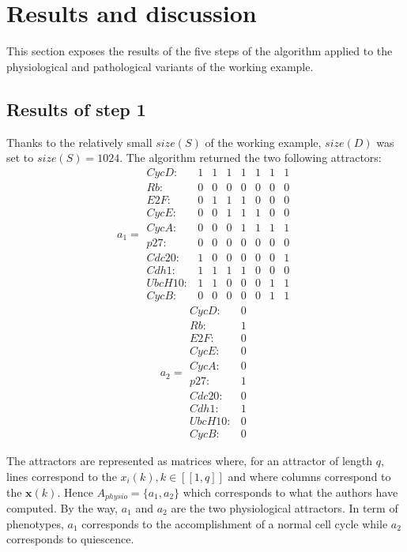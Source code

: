 \documentclass[oneside,a4paper,onecolumn,notitlepage,final]{article}
\begin{document}
\section{Results and discussion}
This section exposes the results of the five steps of the algorithm applied to the physiological and pathological variants of the working example.

\subsection{Results of step 1}
Thanks to the relatively small $size(S)$ of the working example, $size(D)$ was set to $size(S)=1024$. The algorithm returned the two following attractors:
\begin{equation*}
a_{1}=
\begin{matrix}
CycD:&1&1&1&1&1&1&1\\
Rb:&0&0&0&0&0&0&0\\
E2F:&0&1&1&1&0&0&0\\
CycE:&0&0&1&1&1&0&0\\
CycA:&0&0&0&1&1&1&1\\
p27:&0&0&0&0&0&0&0\\
Cdc20:&1&0&0&0&0&0&1\\
Cdh1:&1&1&1&1&0&0&0\\
UbcH10:&1&1&0&0&0&1&1\\
CycB:&0&0&0&0&0&1&1
\end{matrix}
\end{equation*}
\begin{equation*}
a_{2}=
\begin{matrix}
CycD:&0\\
Rb:&1\\
E2F:&0\\
CycE:&0\\
CycA:&0\\
p27:&1\\
Cdc20:&0\\
Cdh1:&1\\
UbcH10:&0\\
CycB:&0
\end{matrix}
\end{equation*}

The attractors are represented as matrices where, for an attractor of length $q$, lines correspond to the $x_i(k), k\in [\![1,q]\!]$ and where columns correspond to the $\boldsymbol{x}(k)$.
Hence $A_{physio}=\lbrace a_{1},a_{2}\rbrace$ which corresponds to what the authors have computed. By the way, $a_{1}$ and $a_{2}$ are the two physiological attractors. In term of phenotypes, $a_{1}$ corresponds to the accomplishment of a normal cell cycle while $a_{2}$ corresponds to quiescence.
\end{document}
